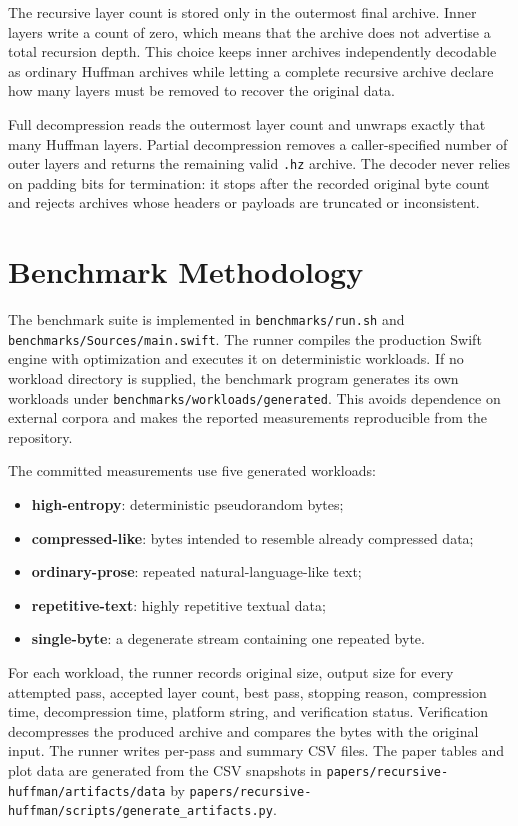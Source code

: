 \documentclass[conference]{IEEEtran}
\begin{document}
The recursive layer count is stored only in the outermost final archive. Inner layers write a count of zero, which means that the archive does not advertise a total recursion depth. This choice keeps inner archives independently decodable as ordinary Huffman archives while letting a complete recursive archive declare how many layers must be removed to recover the original data.

Full decompression reads the outermost layer count and unwraps exactly that many Huffman layers. Partial decompression removes a caller-specified number of outer layers and returns the remaining valid \texttt{.hz} archive. The decoder never relies on padding bits for termination: it stops after the recorded original byte count and rejects archives whose headers or payloads are truncated or inconsistent.

\section{Benchmark Methodology}

The benchmark suite is implemented in \texttt{benchmarks/run.sh} and \texttt{benchmarks/Sources/main.swift}. The runner compiles the production Swift engine with optimization and executes it on deterministic workloads. If no workload directory is supplied, the benchmark program generates its own workloads under \texttt{benchmarks/workloads/generated}. This avoids dependence on external corpora and makes the reported measurements reproducible from the repository.

The committed measurements use five generated workloads:
\begin{itemize}
    \item \textbf{high-entropy}: deterministic pseudorandom bytes;
    \item \textbf{compressed-like}: bytes intended to resemble already compressed data;
    \item \textbf{ordinary-prose}: repeated natural-language-like text;
    \item \textbf{repetitive-text}: highly repetitive textual data;
    \item \textbf{single-byte}: a degenerate stream containing one repeated byte.
\end{itemize}

For each workload, the runner records original size, output size for every attempted pass, accepted layer count, best pass, stopping reason, compression time, decompression time, platform string, and verification status. Verification decompresses the produced archive and compares the bytes with the original input. The runner writes per-pass and summary CSV files. The paper tables and plot data are generated from the CSV snapshots in \texttt{papers/recursive-huffman/artifacts/data} by \texttt{papers/recursive-huffman/scripts/generate\_artifacts.py}.
\end{document}
